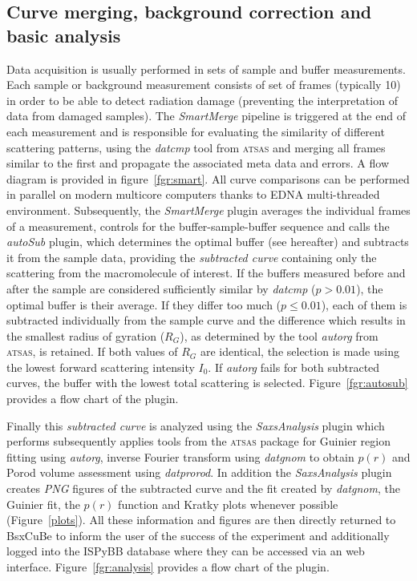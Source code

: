 \documentclass[preprint,pdf]{iucr}              %
\begin{document}
\subsection{Curve merging, background correction and basic analysis}
\label{SM}
Data acquisition is usually performed  in sets of sample and buffer measurements.
Each sample or background measurement consists of set of frames
(typically 10) in order to be able to detect radiation damage
(preventing the interpretation of data from damaged samples).
The \textit{SmartMerge} pipeline is triggered at the end of each measurement
and is responsible for evaluating the similarity of different scattering
patterns, using the \textit{datcmp} tool from \textsc{atsas} and merging all frames
similar to the first and propagate the associated meta data and errors.
A flow diagram is provided in figure~\ref{fgr:smart}.
All curve comparisons can be performed in parallel on modern multicore
computers thanks to EDNA multi-threaded environment.
Subsequently, the \textit{SmartMerge} plugin averages the individual frames
of a measurement, controls for the buffer-sample-buffer sequence and
 calls the \textit{autoSub} plugin, which determines the optimal buffer
(see hereafter) and subtracts it from the sample data,  providing the 
\textit{subtracted curve} containing only the scattering from the macromolecule
of interest.
If the buffers measured before and after the sample are considered sufficiently
similar by \textit{datcmp} ($p > 0.01$), the optimal buffer is their average.
If they differ too much ($p \leq 0.01$), each of them is subtracted individually from the
sample curve and the difference which results in  the smallest radius of gyration ($R_{G}$),
as determined by the tool \textit{autorg} from \textsc{atsas}, is retained.
If both values of $R_{G}$ are identical, the selection is made using the lowest forward scattering intensity $I_{0}$.
If \textit{autorg} fails for both subtracted curves, the buffer with the lowest total scattering is selected.
Figure~\ref{fgr:autosub} provides a flow chart of the plugin.

Finally this \textit{subtracted curve} is analyzed using the
\textit{SaxsAnalysis} plugin which performs subsequently applies tools from the \textsc{atsas} package for Guinier region fitting
using \textit{autorg}, inverse Fourier transform using \textit{datgnom} to obtain
$p(r)$ and Porod volume assessment using \textit{datprorod}.
In addition the \textit{SaxsAnalysis} plugin creates \textit{PNG} figures of
the subtracted curve and the fit created by \textit{datgnom}, the Guinier fit,
the $p(r)$ function and Kratky plots whenever possible (Figure~\ref{plots}).
All these information and figures are then directly returned to BsxCuBe to inform the user
of the success of the experiment and additionally logged into the ISPyBB
database \cite{ISPYBB} where they can be accessed via an web interface.
Figure~\ref{fgr:analysis} provides a flow chart of the plugin.
\end{document}
